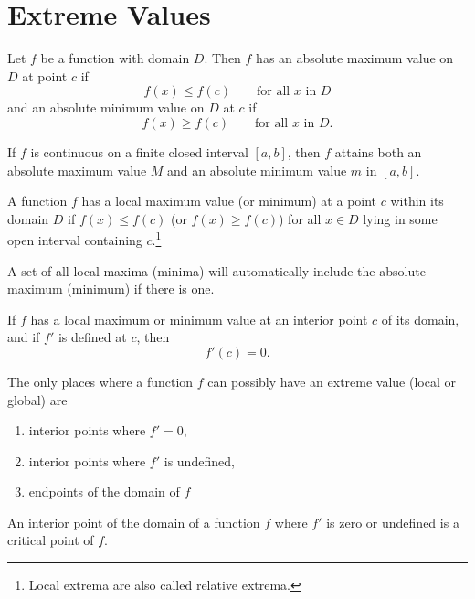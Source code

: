 \documentclass[nobib,notoc]{tufte-handout}
\begin{document}
\section{Extreme Values}
\begin{defi}
	Let \(f\) be a function with domain \(D\). Then \(f\) has an absolute maximum value on \(D\) at point \(c\) if
	\begin{equation*}
		f(x)\leq f(c)\qquad\text{for all \(x\) in \(D\)}
	\end{equation*}
	and an absolute minimum value on \(D\) at \(c\) if
	\begin{equation*}
		f(x)\geq f(c)\qquad\text{for all \(x\) in \(D\).}
	\end{equation*}
\end{defi}
\begin{thm}
	If \(f\) is continuous on a finite closed interval \([a,b]\), then \(f\) attains both an absolute maximum value \(M\) and an absolute minimum value \(m\) in \([a,b]\).
\end{thm}
\begin{defi}
	A function \(f\) has a local maximum value (or minimum) at a point \(c\) within its domain \(D\) if \(f(x)\leq f(c)\) (or \(f(x)\geq f(c)\)) for all \(x\in D\) lying in some open interval containing \(c\).\footnote{Local extrema are also called relative extrema.}
\end{defi}
\begin{rema}
	A set of all local maxima (minima) will automatically include the absolute maximum (minimum) if there is one. 
\end{rema}
\begin{thm}
	If \(f\) has a local maximum or minimum value at an interior point \(c\) of its domain, and if \(f'\) is defined at \(c\), then
	\begin{equation*}
		f'(c)=0.
	\end{equation*}
\end{thm}
\begin{rema}
	The only places where a function \(f\) can possibly have an extreme value (local or global) are
	\begin{enumerate}
		\item interior points where \(f'=0\),
		\item interior points where \(f'\) is undefined,
		\item endpoints of the domain of \(f\)
	\end{enumerate}
\end{rema}
\begin{defi}
	An interior point of the domain of a function \(f\) where \(f'\) is zero or undefined is a critical point of \(f\).
\end{defi}
\end{document}
